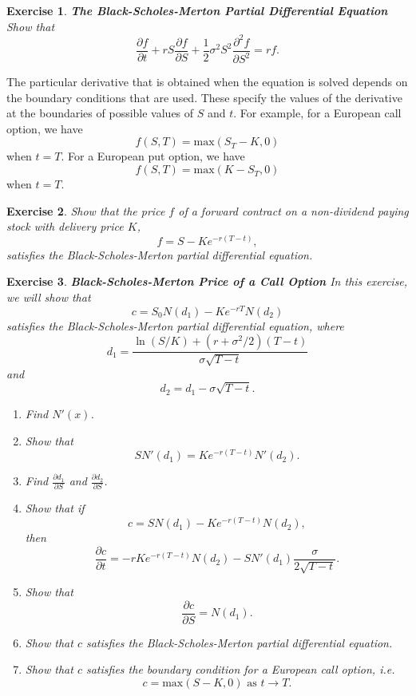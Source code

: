\documentclass[letterpaper,10pt]{article}
\newtheorem{ex}{Exercise}
\begin{document}
\begin{ex}{\bf The Black-Scholes-Merton Partial Differential Equation}
Show that $$\frac{\partial f}{\partial t}+rS\frac{\partial f}{\partial S}+\frac{1}{2}\sigma^2S^2\frac{\partial^2f}{\partial S^2}=rf.$$
\end{ex}

\noindent The particular derivative that is obtained when the equation is solved depends on the boundary conditions that are used. These specify the values of the derivative at the boundaries of possible values of $S$ and $t$.  For example, for a European call option, we have $$f(S,T)=\text{max}(S_T-K,0)$$ when $t=T$.  For a European put option, we have $$f(S,T)=\text{max}(K-S_T,0)$$ when $t=T$.


\begin{ex}
Show that the price $f$ of a forward contract on a non-dividend paying stock with delivery price $K$, $$f=S-Ke^{-r(T-t)},$$ satisfies the Black-Scholes-Merton partial differential equation.
\end{ex}


\begin{ex}{\bf Black-Scholes-Merton Price of a Call Option}
In this exercise, we will show that $$c=S_0N(d_1)-Ke^{-rT}N(d_2)$$ satisfies the Black-Scholes-Merton partial differential equation, where $$d_1=\frac{\ln(S/K)+(r+\sigma^2/2)(T-t)}{\sigma\sqrt{T-t}}$$ and $$d_2=d_1-\sigma\sqrt{T-t}.$$  

\begin{enumerate}

\item[(a)] Find $N'(x)$.
\item[(b)] Show that $$SN'(d_1)=Ke^{-r(T-t)}N'(d_2).$$
\item[(c)] Find $\displaystyle\frac{\partial d_1}{\partial S}$ and $\displaystyle\frac{\partial d_2}{\partial S}$.
\item[(d)] Show that if $$c=SN(d_1)-Ke^{-r(T-t)}N(d_2),$$ then $$\frac{\partial c}{\partial t}=-rKe^{-r(T-t)}N(d_2)-SN'(d_1)\frac{\sigma}{2\sqrt{T-t}}.$$
\item[(e)] Show that $$\frac{\partial c}{\partial S}=N(d_1).$$
\item[(f)] Show that $c$ satisfies the Black-Scholes-Merton partial differential equation.
\item[(g)] Show that $c$ satisfies the boundary condition for a European call option, i.e. $$c=\text{max}(S-K,0)\text{ as }t\rightarrow T.$$
\end{enumerate}
\end{ex}
\end{document}
